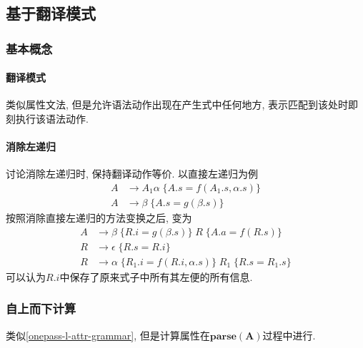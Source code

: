 \documentclass{ctexart}
\begin{document}
\subsection{基于翻译模式}
\subsubsection{基本概念}
\paragraph{翻译模式} 类似属性文法, 但是允许语法动作出现在产生式中任何地方, 表示匹配到该处时即刻执行该语法动作.
\paragraph{消除左递归} 讨论消除左递归时, 保持翻译动作等价. 以直接左递归为例\begin{align*}
        A & \to A_1 \alpha \; \{ A.s = f(A_1.s, \alpha.s)\}\\
        A & \to \beta  \;     \{ A.s = g(\beta.s)\}
    \end{align*}
    按照消除直接左递归的方法变换之后, 变为 \begin{align*}
        A & \to \beta \;     \{ R.i = g(\beta.s) \} \; R \;             \{A.a = f(R.s)\}\\
        R & \to \epsilon  \; \{ R.s = R.i\}\\
        R & \to \alpha \;    \{ R_1.i = f(R.i, \alpha.s) \}\; R_1  \;   \{ R.s = R_1.s \}
    \end{align*}
    可以认为$R.i$中保存了原来式子中所有其左便的所有信息.
\subsubsection{自上而下计算}
    类似\ref{onepass-l-attr-grammar}, 但是计算属性在$\mathbf{parse(A)}$过程中进行.
\end{document}
